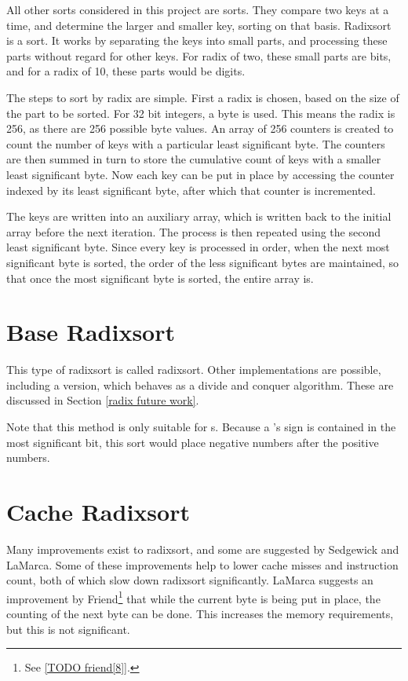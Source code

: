 \label{radix}

All other sorts considered in this project are  sorts.
They compare two keys at a time, and determine the larger and smaller key,
sorting on that basis. Radixsort is a  sort. It works by
separating the keys into small parts, and processing these parts without
regard for other keys. For radix of two, these small parts are bits, and for a
radix of 10, these parts would be digits. 

The steps to sort by radix are simple. First a radix is chosen, based on the
size of the part to be sorted. For 32 bit integers, a byte is used. This means
the radix is 256, as there are 256 possible byte values. An array of 256
counters is created to count the number of keys with a particular least
significant byte. The counters are then summed in turn to store the cumulative
count of keys with a smaller least significant byte. Now each key can be put in
place by accessing the counter indexed by its least significant byte, after
which that counter is incremented.

The keys are written into an auxiliary array, which is written back to the initial
array before the next iteration. The process is then repeated using the second
least significant byte.  Since every key is processed in order, when the next
most significant byte is sorted, the order of the less significant bytes are
maintained, so that once the most significant byte is sorted, the entire array
is.

\section{Base Radixsort}

This type of radixsort is called  radixsort.
Other implementations are possible, including a 
version, which behaves as a divide and conquer algorithm. These are discussed
in Section \ref{radix future work}.

Note that this method is only suitable for s. Because a
's sign is contained in the most significant bit, this sort would
place negative numbers after the positive numbers.

\section{Cache Radixsort}
Many improvements exist to radixsort, and some are suggested by Sedgewick and
LaMarca. Some of these improvements help to lower cache misses and instruction
count, both of which slow down radixsort significantly. LaMarca suggests an
improvement by Friend\footnote{See \ref{TODO friend[8]}.} that while the current
byte is being put in place, the counting of the next byte can be done. This
increases the memory requirements, but this is not significant.

